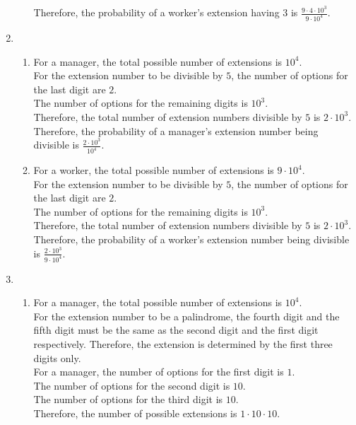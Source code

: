 \documentclass[fleqn, a4paper, 11pt, oneside]{amsart}
\theoremstyle{definition}
\theoremstyle{theorem}
\begin{document}
\begin{solution}
\begin{enumerate}[leftmargin=*]
\begin{enumerate}
					Therefore, the probability of a worker's extension having $3$ is $\frac{9 \cdot 4 \cdot 10^3}{9 \cdot 10^4}$.
			\end{enumerate}
		\item
			\begin{enumerate}
				\item
					For a manager, the total possible number of extensions is $10^4$.\\
					For the extension number to be divisible by $5$, the number of options for the last digit are $2$.\\
					The number of options for the remaining digits is $10^3$.\\
					Therefore, the total number of extension numbers divisible by $5$ is $2 \cdot 10^3$.\\
					Therefore, the probability of a manager's extension number being divisible is $\frac{2 \cdot 10^3}{10^4}$.
				\item
					For a worker, the total possible number of extensions is $9 \cdot 10^4$.\\
					For the extension number to be divisible by $5$, the number of options for the last digit are $2$.\\
					The number of options for the remaining digits is $10^3$.\\
					Therefore, the total number of extension numbers divisible by $5$ is $2 \cdot 10^3$.\\
					Therefore, the probability of a worker's extension number being divisible is $\frac{2 \cdot 10^3}{9 \cdot 10^4}$.
			\end{enumerate}
		\item
			\begin{enumerate}
				\item
					For a manager, the total possible number of extensions is $10^4$.\\
					For the extension number to be a palindrome, the fourth digit and the fifth digit must be the same as the second digit and the first digit respectively.
					Therefore, the extension is determined by the first three digits only.\\
					For a manager, the number of options for the first digit is $1$.\\
					The number of options for the second digit is $10$.\\
					The number of options for the third digit is $10$.\\
					Therefore, the number of possible extensions is $1 \cdot 10 \cdot 10$.\\

\end{enumerate}
\end{enumerate}
\end{solution}
\end{document}
